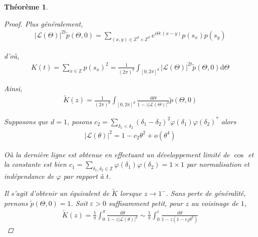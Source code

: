 \documentclass{article}
\newtheorem{theorem}{Théorème}[section]
\theoremstyle{definition}
\begin{document}
\begin{theorem}
\begin{proof}
Plus généralement,
	\begin{align*}
		|\mathcal{L}(\Theta)|^{2t}\tilde{p}(\Theta,0) = \sum_{(x,y)\in\mathbb{Z}^d\times\mathbb{Z}^d} e^{i\Theta.(x-y)}p(s_x)p(s_y)
	\end{align*}

	d'où, 
\begin{align*}
	K(t) = \sum_{x\in \mathbb{Z}}p(s_x)^2 = \frac{1}{(2\pi)^d}\int_{[0,2\pi]^d}|\mathcal{L}(\Theta)|^{2t} \tilde{p}(\Theta, 0)\mathrm{d}\Theta
	\end{align*}

Ainsi, 
\begin{align*}
	\tilde{K}(z)
		     =\frac{1}{(2\pi)^d}\int_{[0,2\pi]^d}\frac{\mathrm{d}\Theta}{1-z|\mathcal{L}(\Theta)|^{2}}\tilde{p}(\Theta, 0)
\end{align*}

Supposons que $d=1$, posons $c_2 = \sum_{\delta_1<\delta_2} (\delta_1-\delta_2)^2 \varphi(\delta_1)\varphi(\delta_2)^*$ alors
\begin{align*}
|\mathcal{L}(\theta)|^2 %
			= 1-c_2\theta^2+o(\theta^4)
\end{align*}

Où la dernière ligne est obtenue en effectuant un développement limité de $\cos$ et la constante est bien $c_1 = \sum_{\delta_1,\delta_2\in\mathbb{Z}}\varphi(\delta_1)\varphi(\delta_2) = 1\times 1$ par normalisation et indépendance de $\varphi$ par rapport à $t$.

Il s'agit d'obtenir un équivalent de $\tilde{K}$ lorsque $z\to 1^-$. Sans perte de généralité, prenons $\tilde{p}(\Theta,0) = 1$. Soit $\varepsilon > 0$ suffisamment petit, pour $z$ au voisinage de $1$, 
\begin{align*}
	\tilde{K}(z) = \frac{1}{\pi}\int_{0}^{\pi}\frac{\mathrm{d}\theta}{1-z|\mathcal{L}(\theta)|^2} 
	\sim\frac{1}{\pi}\int_{0}^{\varepsilon}\frac{\mathrm{d}\theta}{1-z(1-c_2\theta^2)} 
\end{align*}


\end{proof}
\end{theorem}
\end{document}
